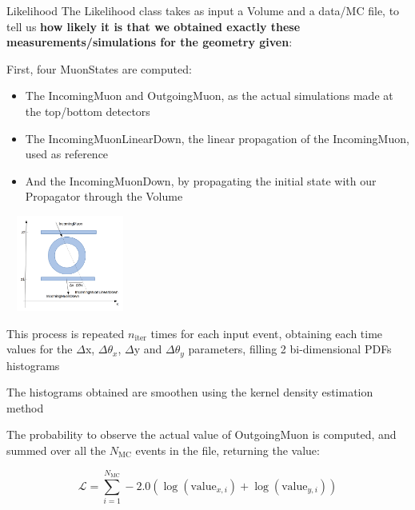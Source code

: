 \documentclass[handout,8 pt]{beamer}
\begin{document}
\begin{frame}{Likelihood}
\justifying
The Likelihood class takes as input a Volume and a data/MC file, to tell us \textbf{how likely it is that we obtained exactly these measurements/simulations for the geometry given}: \vspace{5pt}

\begin{enumerate}
\begin{minipage}[c]{.58\textwidth}
\item First, four MuonStates are computed:
	\begin{itemize}
	\justifying
	\item The IncomingMuon and OutgoingMuon, as the actual simulations made at the top/bottom detectors
	\item The IncomingMuonLinearDown, the linear propagation of the IncomingMuon, used as reference
	\item And the IncomingMuonDown, by propagating the initial state with our Propagator through the Volume
	\end{itemize}
\end{minipage}
\begin{minipage}[c]{.36\textwidth}
\includegraphics[width=4.2cm, height=3.15cm]{figs/parameters.png}
\end{minipage} \vspace{5pt}

\justifying
\item This process is repeated $n_{\text{iter}}$ times for each input event, obtaining each time values for the $\Delta$x, $\Delta \theta_x$, $\Delta$y and $\Delta \theta_y$ parameters, filling 2 bi-dimensional PDFs histograms \vspace{5pt}
\item The histograms obtained are smoothen using the kernel density estimation method \vspace{5pt}
\item The probability to observe the actual value of OutgoingMuon is computed, and summed over all the ${N_\text{MC}}$ events in the file, returning the value:

\begin{equation*}
\label{eq:totallikelihood}
\mathcal{L} = \sum_{i = 1}^{N_\text{MC}} -2.0 \left ( \log(\text{value}_{x, i}) + \log(\text{value}_{y, i}) \right)
\end{equation*}
\end{enumerate} \vfill
\end{frame}
\end{document}
